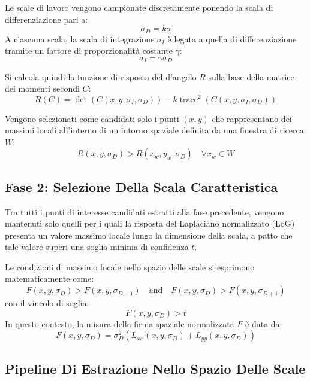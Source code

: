 ﻿\documentclass[11pt, a4paper]{article}
\begin{document}

Le scale di lavoro vengono campionate discretamente ponendo la scala di differenziazione pari a:
\[ \sigma_D = k\sigma \]
A ciascuna scala, la scala di integrazione $\sigma_I$ è legata a quella di differenziazione tramite un fattore di proporzionalità costante $\gamma$:
\[ \sigma_I = \gamma\sigma_D \]

Si calcola quindi la funzione di risposta del d'angolo $R$ sulla base della matrice dei momenti secondi $C$:
\[ R(C) = \det\left(C(x, y, \sigma_I, \sigma_D)\right) - k \operatorname{trace}^2\left(C(x, y, \sigma_I, \sigma_D)\right) \]

Vengono selezionati come candidati solo i punti $(x, y)$ che rappresentano dei massimi locali all'interno di un intorno spaziale definita da una finestra di ricerca $W$:
\[ R(x, y, \sigma_D) > R(x_w, y_w, \sigma_D) \quad \forall x_w \in W \]

\subsection{Fase 2: Selezione Della Scala Caratteristica}

Tra tutti i punti di interesse candidati estratti alla fase precedente, vengono mantenuti solo quelli per i quali la risposta del Laplaciano normalizzato (LoG) presenta un valore massimo locale lungo la dimensione della scala, a patto che tale valore superi una soglia minima di confidenza $t$.


Le condizioni di massimo locale nello spazio delle scale si esprimono matematicamente come:
\[ F(x, y, \sigma_D) > F(x, y, \sigma_{D-1}) \quad \text{and} \quad F(x, y, \sigma_D) > F(x, y, \sigma_{D+1}) \]
con il vincolo di soglia:
\[ F(x, y, \sigma_D) > t \]
In questo contesto, la misura della firma spaziale normalizzata $F$ è data da:
\[ F(x, y, \sigma_D) = \sigma_D^2 \left( L_{xx}(x, y, \sigma_D) + L_{yy}(x, y, \sigma_D) \right) \]

\subsection{Pipeline Di Estrazione Nello Spazio Delle Scale}
\end{document}
